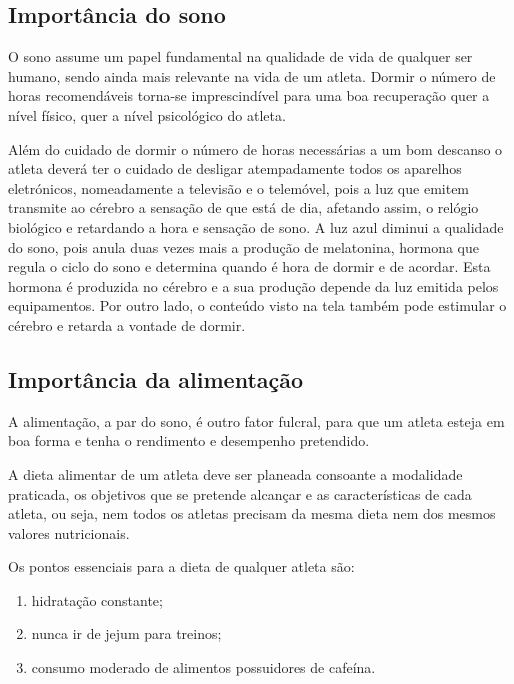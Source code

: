 \documentclass{report}
\begin{document}
    \subsection{Importância do sono}
    O sono assume um papel fundamental na qualidade de vida de qualquer ser humano, sendo ainda mais relevante na vida de um atleta.
    Dormir o número de horas recomendáveis torna-se imprescindível para uma boa recuperação quer a nível físico, quer a nível psicológico do atleta.\par
    Além do cuidado de dormir o número de horas necessárias a um bom descanso o atleta deverá ter o cuidado de desligar atempadamente todos os aparelhos eletrónicos, nomeadamente a televisão e o telemóvel, pois a luz que emitem transmite ao cérebro a sensação de que está de dia, afetando assim, o relógio biológico e retardando a hora e sensação de sono. A luz azul diminui a qualidade do sono, pois anula duas vezes mais a produção de melatonina, hormona que regula o ciclo do sono e determina quando é hora de dormir e de acordar. Esta hormona é produzida no cérebro e a sua produção depende da luz emitida pelos equipamentos. Por outro lado, o conteúdo visto na tela também pode estimular o cérebro e retarda a vontade de dormir. \cite{sono}
    
    \subsection{Importância da alimentação}
    
    A alimentação, a par do sono, é outro fator fulcral, para que um atleta esteja em boa forma e tenha o rendimento e desempenho pretendido. \par
    A dieta alimentar de um atleta deve ser planeada consoante a modalidade praticada, os objetivos que se pretende alcançar e as características de cada atleta, ou seja, nem todos os atletas precisam da mesma dieta nem dos mesmos valores nutricionais. \par
    
    
    Os pontos essenciais para a dieta de qualquer atleta são:

    \renewcommand{\theenumi}{\alph {enumi}}
    \begin{enumerate} 
        \item hidratação constante;
        \item nunca ir de jejum para treinos;
        \item consumo moderado de alimentos possuidores de cafeína.
    \end{enumerate} 
    
\end{document}
